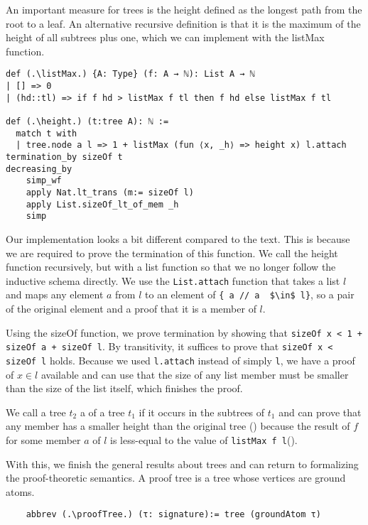 An important measure for trees is the height defined as the longest path from the root to a leaf. An alternative recursive definition is that it is the maximum of the height of all subtrees plus one, which we can implement with the listMax function.

\begin{lstlisting}
def (.\listMax.) {A: Type} (f: A → ℕ): List A → ℕ
| [] => 0
| (hd::tl) => if f hd > listMax f tl then f hd else listMax f tl

def (.\height.) (t:tree A): ℕ :=
  match t with
  | tree.node a l => 1 + listMax (fun ⟨x, _h⟩ => height x) l.attach
termination_by sizeOf t
decreasing_by
    simp_wf
    apply Nat.lt_trans (m:= sizeOf l)
    apply List.sizeOf_lt_of_mem _h
    simp
\end{lstlisting}

Our implementation looks a bit different compared to the text. This is because we are required to prove the termination of this function. We call the height function recursively, but with a list function so that we no longer follow the inductive schema directly. We use the \lstinline|List.attach| function that takes a list $l$ and maps any element $a$ from $l$ to an element of \lstinline|{ a // a  $\in$ l}|, so a pair of the original element and a proof that it is a member of $l$.

Using the sizeOf function, we prove termination by showing that \lstinline|sizeOf x < 1 + sizeOf a + sizeOf l|. By transitivity, it suffices to prove that \lstinline|sizeOf x < sizeOf l| holds. Because we used \lstinline|l.attach| instead of simply \lstinline|l|, we have a proof of $x \in l$ available and can use that the size of any list member must be smaller than the size of the list itself, which finishes the proof. 

We call a tree $t_2$ a \member of a tree $t_1$ if it occurs in the subtrees of $t_1$ and can prove that any member has a smaller height than the original tree (\heightOfMemberIsSmaller) because the result of $f$ for some member $a$ of $l$ is less-equal to the value of \lstinline|listMax f l|(\listMaxlefmember).

With this, we finish the general results about trees and can return to formalizing the proof-theoretic semantics. A proof tree is a tree whose vertices are ground atoms.

\begin{lstlisting}
    abbrev (.\proofTree.) (τ: signature):= tree (groundAtom τ)
\end{lstlisting}

